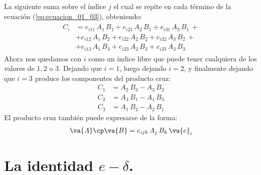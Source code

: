 La siguiente suma sobre el índice $j$ el cual se repite en cada término de la ecuación (\ref{eq:ecuacion_01_03}), obteniendo:
\begin{align}
\begin{aligned}
C_{i} &= e_{i11} \, A_{1} \, B_{1} + e_{i21} \, A_{2} \, B_{1} + e_{i31} \, A_{3} \, B_{1} \, + \\[0.5em]
&+ e_{i12} \, A_{1} \, B_{2} + e_{i22} \, A_{2} \, B_{2} + e_{i32} \, A_{3} \, B_{2} \, + \\[0.5em]
&+ e_{i13} \, A_{1} \, B_{3} + e_{i23} \, A_{2} \, B_{3} + e_{i33} \, A_{3} \, B_{3}
\end{aligned}
\label{eq:ecuacion_01_04}
\end{align}
Ahora nos quedamos con $i$ como un índice libre que puede tener cualquiera de los valores de $1, 2$ o $3$. Dejando que $i = 1$, luego dejando $i = 2$, y finalmente dejando que $i = 3$ produce los componentes del producto cruz:
\begin{align*}
C_{1} &= A_{2} \, B_{3} - A_{3} \, B_{2} \\[0.5em]
C_{2} &= A_{3} \, B_{1} - A_{1} \, B_{3} \\[0.5em]
C_{3} &= A_{1} \, B_{2} - A_{2} \, B_{1}
\end{align*}
El producto cruz también puede expresarse de la forma:
\begin{align*}
\va{A} \cp \va{B} = e_{ijk} \, A_{j} \, B_{k} \, \vu{e}_{i}
\end{align*}

\section{La identidad \texorpdfstring{$e-\delta$}{e-d}.}

